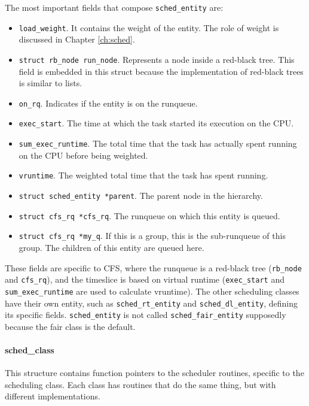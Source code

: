 The most important fields that compose \verb|sched_entity| are:
\begin{itemize}
    \item \verb|load_weight|. It contains the weight of the entity. The role of weight is discussed in Chapter \ref{ch:sched}.
    \item \verb|struct rb_node run_node|. Represents a node inside a red-black tree. This field is embedded in this struct because the implementation of red-black trees is similar to lists.
    \item \verb|on_rq|. Indicates if the entity is on the runqueue.
    \item \verb|exec_start|. The time at which the task started its execution on the CPU. %
    \item \verb|sum_exec_runtime|. The total time that the task has actually spent running on the CPU before being weighted.
    \item \verb|vruntime|. The weighted total time that the task has spent running.
    \item \verb|struct sched_entity *parent|. The parent node in the hierarchy.
    \item \verb|struct cfs_rq *cfs_rq|. The runqueue on which this entity is queued.
    \item \verb|struct cfs_rq *my_q|. If this is a group, this is the sub-runqueue of this group. The children of this entity are queued here.
\end{itemize}
These fields are specific to CFS, where the runqueue is a red-black tree (\verb|rb_node| and \verb|cfs_rq|), and the timeslice is based on virtual runtime (\verb|exec_start| and \verb|sum_exec_runtime| are used to calculate vruntime). The other scheduling classes have their own entity, such as \verb|sched_rt_entity| and \verb|sched_dl_entity|, defining its specific fields. \verb|sched_entity| is not called \verb|sched_fair_entity| supposedly because the fair class is the default. 

\paragraph{sched\_class}
\label{sec:sched_class}
This structure contains function pointers to the scheduler routines, specific to the scheduling class. Each class has routines that do the same thing, but with different implementations.

